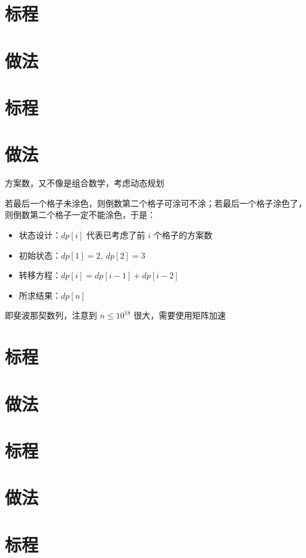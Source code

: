 \documentclass{ctsol}
\begin{document}
\section*{标程}


\makesolution
\section*{做法}

\section*{标程}


\makesolution
\section*{做法}

方案数，又不像是组合数学，考虑动态规划

若最后一个格子未涂色，则倒数第二个格子可涂可不涂；若最后一个格子涂色了，则倒数第二个格子一定不能涂色，于是：

\begin{itemize}
    \item 状态设计：$dp[i]$ 代表已考虑了前 $i$ 个格子的方案数
    \item 初始状态：$dp[1] = 2,~dp[2] = 3$
    \item 转移方程：$dp[i] = dp[i-1] + dp[i-2]$
    \item 所求结果：$dp[n]$
\end{itemize}

即斐波那契数列，注意到 $n \leq {10}^{18}$ 很大，需要使用矩阵加速

\section*{标程}


\makesolution
\section*{做法}

\section*{标程}


\makesolution
\section*{做法}

\section*{标程}

\end{document}
